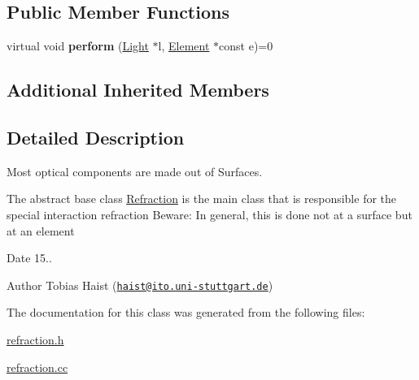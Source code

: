 \subsection*{Public Member Functions}
\begin{DoxyCompactItemize}
\item 
virtual void {\bfseries perform} (\hyperlink{classLight}{Light} $\ast$l, \hyperlink{classElement}{Element} $\ast$const e)=0\hypertarget{classRefraction_aa32f9a0371dca4feb9984e999906c940}{}\label{classRefraction_aa32f9a0371dca4feb9984e999906c940}

\end{DoxyCompactItemize}
\subsection*{Additional Inherited Members}


\subsection{Detailed Description}
Most optical components are made out of Surfaces. 

The abstract base class \hyperlink{classRefraction}{Refraction} is the main class that is responsible for the special interaction refraction Beware\+: In general, this is done not at a surface but at an element

\begin{DoxyDate}{Date}
15.. 
\end{DoxyDate}
\begin{DoxyAuthor}{Author}
Tobias Haist (\href{mailto:haist@ito.uni-stuttgart.de}{\tt haist@ito.\+uni-\/stuttgart.\+de}) 
\end{DoxyAuthor}


The documentation for this class was generated from the following files\+:\begin{DoxyCompactItemize}
\item 
\hyperlink{refraction_8h}{refraction.\+h}\item 
\hyperlink{refraction_8cc}{refraction.\+cc}\end{DoxyCompactItemize}
